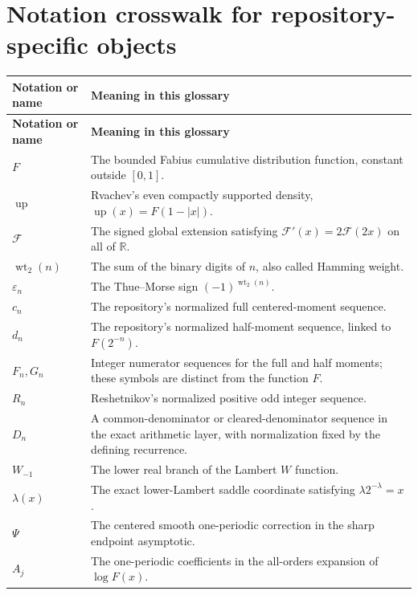 \documentclass[11pt,oneside]{article}
\newcommand{\R}{\mathbb R}
\newcommand{\Up}{\operatorname{up}}
\newcommand{\wt}{\operatorname{wt}_2}
\begin{document}
\section{Notation crosswalk for repository-specific objects}
\begin{longtable}{p{}p{}}
\toprule
\textbf{Notation or name} & \textbf{Meaning in this glossary}\\
\midrule
\endfirsthead
\toprule
\textbf{Notation or name} & \textbf{Meaning in this glossary}\\
\midrule
\endhead
$F$ & The bounded Fabius cumulative distribution function, constant outside $[0,1]$.\\
$\Up$ & Rvachev's even compactly supported density, $\Up(x)=F(1-|x|)$.\\
$\mathcal F$ & The signed global extension satisfying $\mathcal F'(x)=2\mathcal F(2x)$ on all of $\R$.\\
$\wt(n)$ & The sum of the binary digits of $n$, also called Hamming weight.\\
$\varepsilon_n$ & The Thue--Morse sign $(-1)^{\wt(n)}$.\\
$c_n$ & The repository's normalized full centered-moment sequence.\\
$d_n$ & The repository's normalized half-moment sequence, linked to $F(2^{-n})$.\\
$F_n,G_n$ & Integer numerator sequences for the full and half moments; these symbols are distinct from the function $F$.\\
$R_n$ & Reshetnikov's normalized positive odd integer sequence.\\
$D_n$ & A common-denominator or cleared-denominator sequence in the exact arithmetic layer, with normalization fixed by the defining recurrence.\\
$W_{-1}$ & The lower real branch of the Lambert $W$ function.\\
$\lambda(x)$ & The exact lower-Lambert saddle coordinate satisfying $\lambda 2^{-\lambda}=x$.\\
$\Psi$ & The centered smooth one-periodic correction in the sharp endpoint asymptotic.\\
$A_j$ & The one-periodic coefficients in the all-orders expansion of $\log F(x)$.\\
\bottomrule
\end{longtable}
\end{document}
